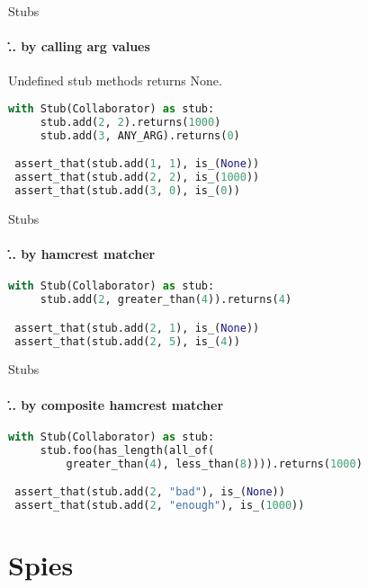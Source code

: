 \documentclass[11pt]{beamer}
\begin{document}
\begin{frame}[fragile]{Stubs}
\framesubtitle{\... by calling arg values}
Undefined stub methods returns None.

\begin{exampleblock}{}
\begin{lstlisting}[language=Python]
 with Stub(Collaborator) as stub:
     stub.add(2, 2).returns(1000)
     stub.add(3, ANY_ARG).returns(0)

 assert_that(stub.add(1, 1), is_(None))
 assert_that(stub.add(2, 2), is_(1000))
 assert_that(stub.add(3, 0), is_(0))
\end{lstlisting}
\end{exampleblock}

\end{frame}


\begin{frame}[fragile]{Stubs}
\framesubtitle{\... by hamcrest matcher}

\begin{exampleblock}{}
\begin{lstlisting}[language=Python]
 with Stub(Collaborator) as stub:
     stub.add(2, greater_than(4)).returns(4)

 assert_that(stub.add(2, 1), is_(None))
 assert_that(stub.add(2, 5), is_(4))
\end{lstlisting}
\end{exampleblock}

\end{frame}


\begin{frame}[fragile]{Stubs}
\framesubtitle{\... by composite hamcrest matcher}

\begin{exampleblock}{}
\begin{lstlisting}[language=Python]
 with Stub(Collaborator) as stub:
     stub.foo(has_length(all_of(
         greater_than(4), less_than(8)))).returns(1000)

 assert_that(stub.add(2, "bad"), is_(None))
 assert_that(stub.add(2, "enough"), is_(1000))
\end{lstlisting}
\end{exampleblock}

\end{frame}


\section{Spies}
\end{document}
